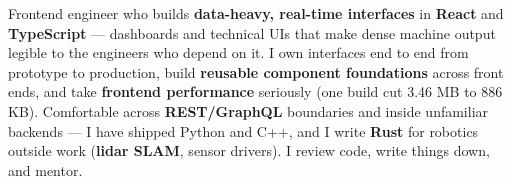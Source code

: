 
\begin{cvparagraph}
Frontend engineer who builds \textbf{data-heavy, real-time interfaces} in \textbf{React} and \textbf{TypeScript} --- dashboards and technical UIs that make dense machine output legible to the engineers who depend on it. I own interfaces end to end from prototype to production, build \textbf{reusable component foundations} across front ends, and take \textbf{frontend performance} seriously (one build cut 3.46 MB to 886 KB). Comfortable across \textbf{REST/GraphQL} boundaries and inside unfamiliar backends --- I have shipped Python and C++, and I write \textbf{Rust} for robotics outside work (\textbf{lidar SLAM}, sensor drivers). I review code, write things down, and mentor.
\end{cvparagraph}
